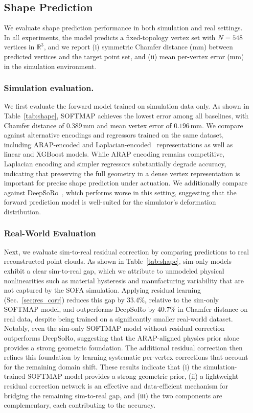 \documentclass[letterpaper, 10 pt, conference]{ieeeconf}  %
\newcommand{\algname}{SOFTMAP\xspace}
\begin{document}
\subsection{Shape Prediction}

\label{sec:shape_eval}

We evaluate shape prediction performance in both simulation and real settings. In all experiments, the model predicts a fixed-topology vertex set with $N=548$ vertices in $\mathbb{R}^3$, and we report (i) symmetric Chamfer distance (mm) between predicted vertices and the target point set, and (ii) mean per-vertex error (mm) in the simulation environment. 

\subsubsection{Simulation evaluation.}
We first evaluate the forward model trained on simulation data only. As shown in Table~\ref{tab:shape}, \algname achieves the lowest error among all baselines, with Chamfer distance of $0.389$\,mm and mean vertex error of $0.196$\,mm. We compare against alternative encodings and regressors trained on the same dataset, including ARAP-encoded and Laplacian-encoded~\cite{sorkine2004laplacian} representations as well as linear and XGBoost models. While ARAP encoding remains competitive, Laplacian encoding and simpler regressors substantially degrade accuracy, indicating that preserving the full geometry in a dense vertex representation is important for precise shape prediction under actuation. We additionally compare against DeepSoRo~\cite{yoo2023toward}, which performs worse in this setting, suggesting that the forward prediction model is well-suited for the simulator’s deformation distribution.

\subsubsection{Real-World Evaluation}
Next, we evaluate sim-to-real residual correction by comparing predictions to real reconstructed point clouds. As shown in Table~\ref{tab:shape}, sim-only models exhibit a clear sim-to-real gap, which we attribute to unmodeled physical nonlinearities such as material hysteresis and manufacturing variability that are not captured by the SOFA simulation. Applying residual learning (Sec.~\ref{sec:res_corr}) reduces this gap by 33.4\%, relative to the sim-only \algname model, and outperforms DeepSoRo by 40.7\% in Chamfer distance on real data, despite being trained on a significantly smaller real-world dataset. Notably, even the sim-only \algname model without residual correction outperforms DeepSoRo, suggesting that the ARAP-aligned physics prior alone provides a strong geometric foundation. The additional residual correction then refines this foundation by learning systematic per-vertex corrections that account for the remaining domain shift. These results indicate that (i) the simulation-trained \algname model provides a strong geometric prior, (ii) a lightweight residual correction network is an effective and data-efficient mechanism for bridging the remaining sim-to-real gap, and (iii) the two components are complementary, each contributing to the accuracy.
\end{document}
